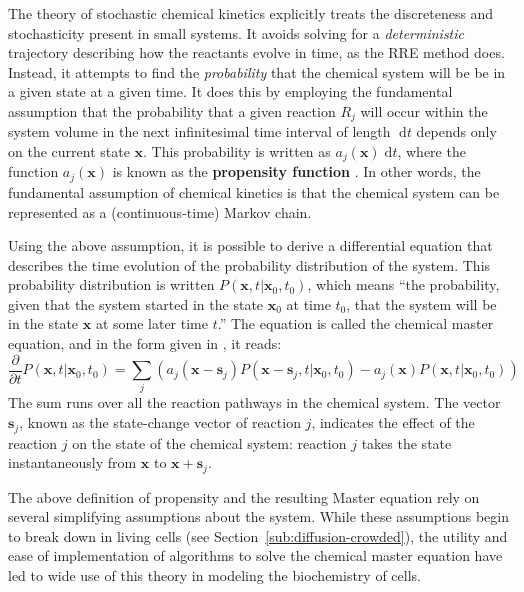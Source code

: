 \documentclass[english,letterpaper,12pt]{article}
\newcommand{\defkeywd}[1]{\textbf{#1}}
\newcommand{\dee}{\;\mathrm{d}}
\renewcommand{\vec}[1]{\ensuremath{\mathbf{#1}}}
\begin{document}
\begin{doublespacing}
The theory of stochastic chemical kinetics explicitly treats the discreteness and stochasticity present in small systems. It avoids solving for a \emph{deterministic} trajectory describing how the reactants evolve in time, as the RRE method does. Instead, it attempts to find the \emph{probability} that the chemical system will be be in a given state at a given time. It does this by employing the fundamental assumption that the probability that a given reaction $R_j$ will occur within the system volume in the next infinitesimal time interval of length $\dee t$ depends only on the current state $\vec{x}$. This probability is written as $a_j(\vec{x}) \dee t$, where the function $a_j(\vec{x})$ is known as the \defkeywd{propensity function} \cite{gillespie-ssa}. In other words, the fundamental assumption of chemical kinetics is that the chemical system can be represented as a (continuous-time) Markov chain.

Using the above assumption, it is possible to derive a differential equation that describes the time evolution of the probability distribution of the system. This probability distribution is written $P(\vec{x}, t | \vec{x}_0, t_0)$, which means ``the probability, given that the system started in the state $\vec{x}_0$ at time $t_0$, that the system will be in the state $\vec{x}$ at some later time $t$.'' The equation is called the chemical master equation, and in the form given in \cite{gillespie-ssa}, it reads:
\begin{equation}
    \frac{\partial}{\partial t} P(\vec{x}, t | \vec{x}_0, t_0) = \sum_j \left( a_j (\vec{x} - \vec{s}_j) P(\vec{x} - \vec{s}_j, t | \vec{x}_0, t_0) - a_j(\vec{x}) P(\vec{x}, t | \vec{x}_0, t_0) \right)
    \label{eq:master-eqn}
\end{equation}
The sum runs over all the reaction pathways in the chemical system. The vector $\vec{s}_j$, known as the state-change vector of reaction $j$, indicates the effect of the reaction $j$ on the state of the chemical system: reaction $j$ takes the state instantaneously from $\vec{x}$ to $\vec{x} + \vec{s}_j$.

The above definition of propensity and the resulting Master equation rely on several simplifying assumptions about the system.   While these assumptions begin to break down in living cells (see Section~\ref{sub:diffusion-crowded}), the utility and ease of implementation of algorithms to solve the chemical master equation have led to wide use of this theory in modeling the biochemistry of cells. 


\end{doublespacing}
\end{document}
